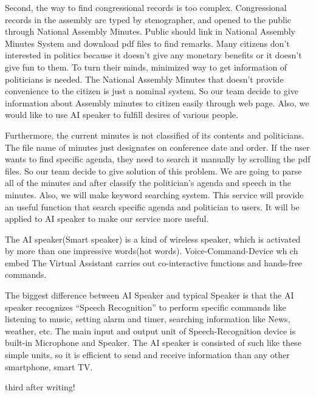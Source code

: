 \documentclass[conference]{IEEEtran}
\begin{document}
Second, the way to find congressional records is too complex. Congressional records in the assembly are typed by stenographer, and opened to the public through National Assembly Minutes. Public should link in National Assembly Minutes System and download pdf files to find remarks. Many citizens don’t interested in politics because it doesn’t give any monetary benefits or it doesn’t give fun to them. To turn their minds, minimized way to get information of politicians is needed. The National Assembly Minutes that doesn’t provide convenience to the citizen is just a nominal system. So our team decide to give information about Assembly minutes to citizen easily through web page. Also, we would like to use AI speaker to fulfill desires of various people.

Furthermore, the current minutes is not classified of its contents and politicians. The file name of minutes just designates on conference date and order. If the user wants to find specific agenda, they need to search it manually by scrolling the pdf files. So our team decide to give solution of this problem. We are going to parse all of the minutes and after classify the politician’s agenda and speech in the minutes. Also, we will make keyword searching system. This service will provide an useful function that search specific agenda and politician to users. It will be applied to AI speaker to make our service more useful.

The AI speaker(Smart speaker) is a kind of wireless speaker, which is activated by more than one impressive words(hot words). Voice-Command-Device wh ch embed The Virtual Assistant carries out co-interactive functions and hands-free commands.

The biggest difference between AI Speaker and typical Speaker is that the AI speaker recognizes “Speech Recognition” to perform specific commands like listening to music, setting alarm and timer, searching information like News, weather, etc. The main input and output unit of Speech-Recognition device is built-in Microphone and Speaker. The AI speaker is consisted of such like these simple units, so it is efficient to send and receive information than any other smartphone, smart TV.

third after writing!
\end{document}
